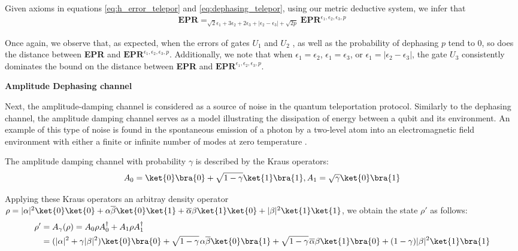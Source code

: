 \begin{example}
   Given axioms in equations \eqref{eq:h_error_telepor} and \eqref{eq:dephasing_telepor}, using our metric deductive system, we infer that
   \begin{align} \label{eq:epr_error_teleport}
    \textbf{EPR} =_{\sqrt{2}\epsilon_1 + 3 \epsilon_2 + 2\epsilon_3 + |\epsilon_2-\epsilon_3| + \sqrt{2p}} \textbf{EPR}^{\epsilon_1,\epsilon_2, \epsilon_3,p}
   \end{align}

    Once again, we observe that, as expected,  when the errors of gates $U_1$ and  $U_2$ , as well as the probability of dephasing $p$ tend to $0$, so does the distance between \textbf{EPR} and $\textbf{EPR}^{\epsilon_1,\epsilon_2, \epsilon_3,p}$. Additionally, we note that when $\epsilon_1 = \epsilon_2$, $\epsilon_1 = \epsilon_3$, or $\epsilon_1 = |\epsilon_2 - \epsilon_3|$, the gate $U_3$ consistently dominates the bound on the distance between \textbf{EPR} and $\textbf{EPR}^{\epsilon_1,\epsilon_2,\epsilon_3,p}$.


    \vspace{5pt}

     \textbf{Amplitude Dephasing channel}

     Next, the amplitude-damping channel is considered as a source of noise in the quantum teleportation protocol. Similarly to the dephasing channel, the amplitude damping channel serves as a model illustrating the dissipation of energy between a qubit and its environment. An example of this type of noise is found in the spontaneous emission of a photon by a two-level atom into an electromagnetic field environment with either a finite or infinite number of modes at zero temperature \cite{salles2008experimental, Wang_2011}.

     The amplitude damping channel with probability $\gamma$ is described by the Kraus operators:
\begin{equation*}
     A_{0}= \ket{0} \bra{0} + \sqrt{1-\gamma} \ket{1} \bra{1} ,  A_{1}= \sqrt{\gamma} \ket{0} \bra{1}
\end{equation*}

Applying these Kraus operators an arbitray density operator $\rho=|\alpha|^{2} \ket{0} \ket{0} + \alpha \overline{\beta} \ket{0} \ket{1} + \overline{\alpha} \beta \ket{1} \ket{0} + |\beta|^{2} \ket{1} \ket{1}$, we obtain the state $\rho'$ as follows:
\begin{align*}
     \rho' & = A_\gamma(\rho) =  A_{0} \rho A_{0}^{\dag} + A_{1} \rho A_{1}^{\dag} \\
     & = (|\alpha|^{2} + \gamma |\beta|^{2}) \ket{0}\bra{0} + \sqrt{1-\gamma} \hspace{1pt} \alpha \overline{\beta} \ket{0}\bra{1} + \sqrt{1-\gamma} \hspace{1pt} \overline{\alpha} \beta \ket{1}\bra{0} + (1-\gamma) |\beta|^{2} \ket{1}\bra{1}
\end{align*}


\end{example}
